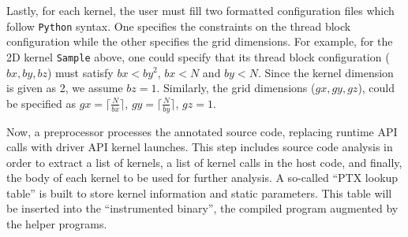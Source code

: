 Lastly, for each kernel, the user must fill two formatted configuration 
files which follow \texttt{Python} syntax.
One specifies the constraints on the thread block configuration
while the other specifies the grid dimensions.
For example, for the 2D kernel \texttt{Sample} above, 
one could specify that its thread block configuration ($bx,by,bz$) must satisfy 
$bx < by^2$, $bx < N$ and $by < N$.
Since the kernel dimension is given as 2, we assume $bz=1$. 
Similarly, the grid dimensions ($gx,gy,gz$), could be specified as
$gx=\lceil \frac{N}{bx} \rceil$,  
$gy=\lceil  \frac{N}{by} \rceil$, $gz=1$. 
	

Now, a preprocessor processes 
the annotated source code, replacing {\cuda} runtime API calls with driver 
API kernel launches. 
This step includes source code analysis in order to extract
a list of kernels, a list of kernel calls in the host code, 
and finally, the body of each kernel to be used for further analysis.
A so-called ``PTX lookup table'' is built to store
kernel information and static parameters.
This table will be inserted into the ``instrumented binary'', the
compiled {\cuda} program augmented by the helper programs. 

